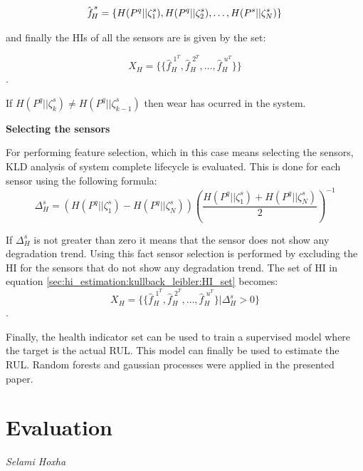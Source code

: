 \begin{equation}
    \hat{\emph{f}}_H^{\,\,s} = \{H(P^q||\zeta_1^s),H(P^q||\zeta_2^s),\dots ,H(P^s||\zeta_N^s)\}
\end{equation}


and finally the HIs of all the sensors are is given by the set:

\begin{equation}
    \label{sec:hi_estimation:kullback_leibler:HI_set}
    X_H = \big\{ \{ \hat{f}_H^{\,\, 1^T} , \hat{f}_H^{\,\, 2^T},\dots, \hat{f}_H^{\,\, u^T} \} \big\}
\end{equation}
.

If $H(P^q||\zeta_k^s) \neq H(P^q||\zeta_{k-1}^s)$ then wear has ocurred in the system.

\textbf{Selecting the sensors}

For performing feature selection, which in this case means selecting the sensors, KLD analysis of system complete lifecycle is evaluated.
This is done for each sensor using the following formula:
\begin{equation}
    \Delta_H^s =
    \left(H(P^q||\zeta_1^s)-H(P^q||\zeta_N^s)\right)
    \left(\frac{H(P^q||\zeta_1^s)+H(P^q||\zeta_N^s)}{2}\right)^{-1}
\end{equation}

If $\Delta_H^s$ is not greater than zero it means that the sensor does not show any degradation trend. Using this fact sensor selection
is performed by excluding the HI for the sensors that do not show any degradation trend. The set
of HI in equation \ref{sec:hi_estimation:kullback_leibler:HI_set} becomes:
\begin{equation}
    X_H = \big\{ \{ \hat{f}_H^{\,\, 1^T} , \hat{f}_H^{\,\, 2^T},\dots, \hat{f}_H^{\,\, u^T} \} | \Delta_H^s>0 \big\}
\end{equation}
.

Finally, the health indicator set can be used to train a supervised model where the target is the actual RUL.
This model can finally be used to estimate the RUL. Random forests and gaussian processes were applied in
the presented paper.

\newpage
\section{Evaluation}
\vspace*{-15mm}
\hfill{\normalsize\emph{Selami Hoxha}}
\label{sec:hi_estimation:evaluation}

